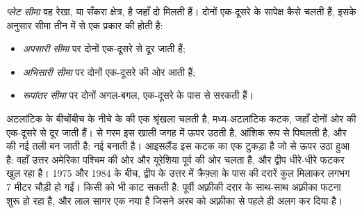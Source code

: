 \begin{definition}[प्लेट सीमा]\label{def:g7:plate-tectonics:plate-boundary}
\emph{प्लेट सीमा} वह रेखा, या सँकरा क्षेत्र, है जहाँ दो
 मिलती हैं। दोनों  एक-दूसरे के सापेक्ष कैसे चलती हैं, इसके
अनुसार सीमा तीन में से एक प्रकार की होती है:
\begin{itemize}
  \item \emph{अपसारी सीमा} पर दोनों  एक-दूसरे से
        दूर जाती हैं;
  \item \emph{अभिसारी सीमा} पर दोनों  एक-दूसरे
        की ओर आती हैं;
  \item \emph{रूपांतर सीमा} पर दोनों  अगल-बगल,
        एक-दूसरे के पास से सरकती हैं।
\end{itemize}
\end{definition}

\begin{example}\label{ex:g7:plate-tectonics:divergent}
अटलांटिक  के बीचोंबीच  के नीचे के  की एक श्रृंखला चलती
है, मध्य-अटलांटिक कटक, जहाँ दोनों ओर की  एक-दूसरे से दूर जाती हैं।
 से गरम  इस खाली जगह में ऊपर उठती है, आंशिक रूप से पिघलती है,
और  की नई तली बन जाती है:  नई  बनाती है। आइसलैंड इस
कटक का एक टुकड़ा है जो  से ऊपर उठा हुआ है: वहाँ उत्तर अमेरिका पश्चिम की
ओर और यूरेशिया पूर्व की ओर चलता है, और द्वीप धीरे-धीरे फटकर खुल रहा है। 1975
और 1984 के बीच, द्वीप के उत्तर में क्रैफ़्ला  के पास की दरारें कुल
मिलाकर लगभग 7 मीटर चौड़ी हो गईं।  किसी  को भी काट सकती
है: पूर्वी अफ़्रीकी दरार  के साथ-साथ अफ़्रीका फटना शुरू हो रहा है, और लाल
सागर एक नया  है जिसने अरब को अफ़्रीका से पहले ही अलग कर दिया
है।
\end{example}

